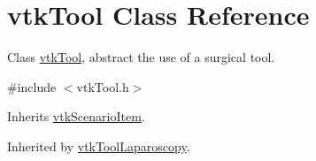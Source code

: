 \hypertarget{classvtkTool}{
\section{vtkTool Class Reference}
\label{classvtkTool}
}


Class \hyperlink{classvtkTool}{vtkTool}, abstract the use of a surgical tool.  




{\ttfamily \#include $<$vtkTool.h$>$}



Inherits \hyperlink{classvtkScenarioItem}{vtkScenarioItem}.



Inherited by \hyperlink{classvtkToolLaparoscopy}{vtkToolLaparoscopy}.



